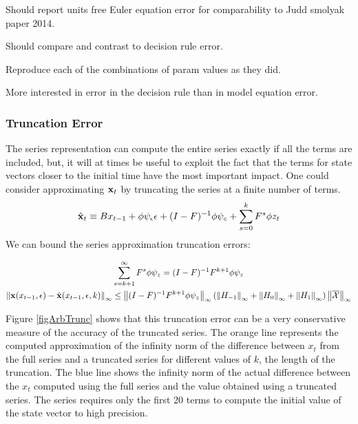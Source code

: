\documentclass[12pt]{article}
\begin{document}
{\color{blue}
Should report units free Euler equation error for comparability to   Judd smolyak paper 2014.

Should compare and contrast to decision rule error.

Reproduce each of the combinations of param values as they did.

More interested in error in the decision rule than in model equation error.
}

\subsubsection{Truncation Error}


The series representation can compute the entire series exactly
if all the terms are included, but, it will at times be useful to exploit the fact that
the terms for state vectors closer 
to the initial time have the most important impact.
One could consider approximating  $\mathbf{x}_t$ by 
truncating the series  at a finite number of terms.
 	 \begin{gather}
 	 \hat{\mathbf{x}}_t \equiv B x_{t-1}+ \phi \psi_\epsilon\epsilon  + (I - F)^{-1} \phi \psi_c + \sum_{s=0}^k F^s \phi z_{t}\label{theTruncSeries}
 \end{gather}
We can bound the  series approximation truncation errors:

    \begin{gather}
      \label{eq:1}
\sum_{s=k+1}^{\infty} F^s \phi \psi_z = (I -F)^{-1} F^{k+1}\phi \psi_z       \\
\left\lVert\mathbf{x}(x_{t-1},\epsilon)-\hat{\mathbf{x}}(x_{t-1},\epsilon,k)\right\rVert_\infty \le \left\lVert(I -F)^{-1} F^{k+1}\phi \psi_z\right\rVert_\infty \left ( \left\lVert H_{-1} \right\rVert_\infty+ \left\lVert H_{0} \right\rVert_\infty+ \left\lVert H_{1} \right\rVert_\infty \right )\left\lVert\overline{\mathcal{X}}\right\rVert_\infty
    \end{gather}


 Figure \ref{figArbTrunc} shows
that this truncation error can be  a very conservative measure of the accuracy
of the truncated series.  The orange line represents the computed approximation of
the infinity norm of the difference between $x_t$ from the full series and a truncated series for different values of $k$, the length of the truncation.  The blue line shows the infinity norm of the actual difference between the $x_t$ computed using the full series and the value obtained using a truncated series.  The series requires only the first 20 terms to compute
the initial value of the state vector to high precision. 
\end{document}
